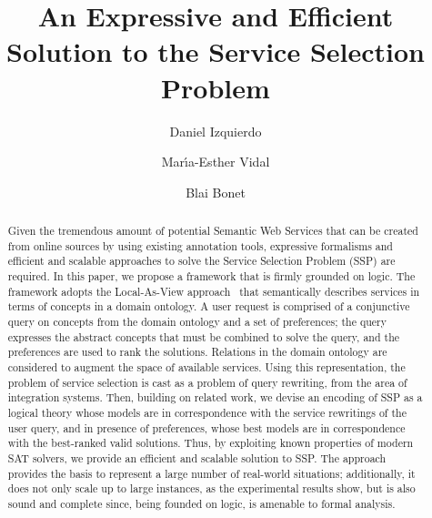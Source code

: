 \documentclass{llncs}
\begin{document}
\allowdisplaybreaks
\title{An Expressive and Efficient Solution to the Service Selection Problem}
\author{Daniel Izquierdo \and Mar\'{\i}a-Esther Vidal \and Blai Bonet}
\maketitle

\begin{abstract}
Given the tremendous amount of potential Semantic Web 
Services that can be created from online sources by using existing 
annotation tools, expressive formalisms and efficient and scalable approaches to solve the Service Selection Problem (SSP) are required. In this paper, we propose a framework that 
is firmly grounded on logic. The framework adopts the Local-As-View 
approach~\cite{levy:bucket} that semantically describes services in terms of concepts in a domain 
ontology. A user request is comprised of a conjunctive query on concepts 
from the domain ontology and a set of preferences; the query expresses 
the abstract concepts that must be combined to solve the query, and 
the preferences are used to rank the solutions. Relations in the domain 
ontology are considered to augment the space of available services. Using 
this representation, the problem of service selection is cast as a problem 
of query rewriting, from the area of integration systems. Then, 
building on related work, we devise an encoding of SSP as a logical theory 
whose models are in correspondence with the service rewritings of the 
user query, and in presence of preferences, whose best models are in 
correspondence with the best-ranked valid solutions. Thus, by exploiting 
known properties of modern SAT solvers, we provide an efficient and 
scalable solution to SSP. The approach provides the basis to represent 
a large number of real-world situations; additionally, it does not 
only scale up to large instances, as the experimental results show, 
but is also sound and complete since, being founded on logic, is 
amenable to formal analysis.
\end{abstract}                
\end{document}
